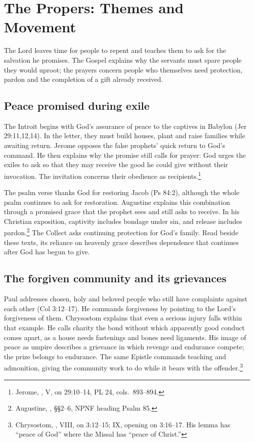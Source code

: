 \section{The Propers: Themes and Movement}
The Lord leaves time for people to repent and teaches them to ask for the
salvation he promises. The Gospel explains why the servants must spare
people they would uproot; the prayers concern people who themselves need
protection, pardon and the completion of a gift already received.

\subsection{Peace promised during exile}
The Introit begins with God's assurance of peace to the captives in Babylon
(Jer 29:11,12,14). In the letter, they must build houses, plant and raise
families while awaiting return. Jerome opposes the false prophets' quick
return to God's command. He then explains why the promise still calls for
prayer: God urges the exiles to ask so that they may receive the good he
could give without their invocation. The invitation concerns their
obedience as recipients.\footnote{Jerome, ,
V, on 29:10--14, PL 24, cols.~893--894.}

The psalm verse thanks God for restoring Jacob (Ps 84:2), although the
whole psalm continues to ask for restoration. Augustine explains this
combination through a promised grace that the prophet sees and still
asks to receive. In his Christian exposition, captivity includes bondage
under sin, and release includes pardon.\footnote{Augustine,
, §§2--6, NPNF heading Psalm 85.}
The Collect asks continuing protection for God's family. Read beside
these texts, its reliance on heavenly grace describes dependence that
continues after God has begun to give.

\subsection{The forgiven community and its grievances}
Paul addresses chosen, holy and beloved people who still have complaints
against each other (Col 3:12--17). He commands forgiveness by pointing to
the Lord's forgiveness of them. Chrysostom explains that even a serious
injury falls within that example. He calls charity the bond without which
apparently good conduct comes apart, as a house needs fastenings and bones
need ligaments. His image of peace as umpire describes a grievance in
which revenge and endurance compete; the prize belongs to endurance.
The same Epistle commands teaching and admonition, giving the community
work to do while it bears with the offender.\footnote{Chrysostom,
, VIII, on 3:12--15; IX, opening on 3:16--17.
His lemma has ``peace of God'' where the Missal has ``peace of Christ.''}

